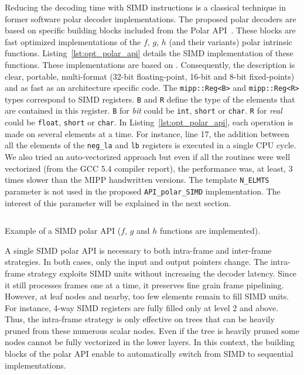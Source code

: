 Reducing the decoding time with SIMD instructions is a classical technique in
former software polar decoder implementations. The proposed polar decoders are
based on specific building blocks included from the Polar
API~\cite{Cassagne2015c,Cassagne2016b}. These blocks are fast optimized
implementations of the $f$, $g$, $h$ (and their variants) polar intrinsic
functions. Listing~\ref{lst:opt_polar_api} details the SIMD implementation of
these functions. These implementations are based on \MIPP. Consequently, the
description is clear, portable, multi-format (32-bit floating-point, 16-bit and
8-bit fixed-points) and as fast as an architecture specific code. The
\verb|mipp::Reg<B>| and \verb|mipp::Reg<R>| types correspond to SIMD registers.
\verb|B| and \verb|R| define the type of the elements that are contained in this
register. \verb|B| for \textit{bit} could be \verb|int|, \verb|short| or
\verb|char|. \verb|R| for \textit{real} could be \verb|float|, \verb|short| or
\verb|char|. In Listing~\ref{lst:opt_polar_api}, each operation is made on
several elements at a time. For instance, line 17, the addition between all the
elements of the \verb|neg_la| and \verb|lb| registers is executed in a single
CPU cycle. We also tried an auto-vectorized approach but even if all the
routines were well vectorized (from the GCC 5.4 compiler report), the
performance was, at least, 3 times slower than the MIPP handwritten versions.
The template \verb|N_ELMTS| parameter is not used in the proposed
\verb|API_polar_SIMD| implementation. The interest of this parameter will be
explained in the next section.

\begin{listing}
  \inputminted[frame=lines,linenos]{C++}{\curChapter/src/polar/f_g_h_simd.cpp}
  \caption{Example of a \Cxx SIMD polar API ($f$, $g$ and $h$ functions are
    implemented).}
  \label{lst:opt_polar_api}
\end{listing}

A single SIMD polar API is necessary to both intra-frame and inter-frame
strategies. In both cases, only the input and output pointers change. The
intra-frame strategy exploits SIMD units without increasing the decoder latency.
Since it still processes frames one at a time, it preserves fine grain
frame pipelining. However, at leaf nodes and nearby, too few elements remain to
fill SIMD units. For instance, 4-way SIMD registers are fully filled only at
level 2 and above. Thus, the intra-frame strategy is only effective on trees
that can be heavily pruned from these numerous scalar nodes. Even if the tree is
heavily pruned some nodes cannot be fully vectorized in the lower layers. In
this context, the building blocks of the polar API enable to automatically
switch from SIMD to sequential implementations.

